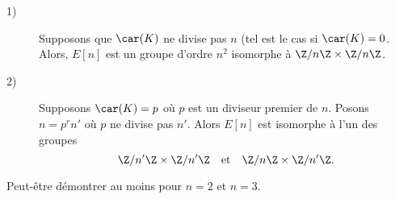 
\begin{theoreme}
    \begin{description}
        \item[1)] Supposons que $\car(K)$ ne divise pas $n$ (tel est le cas si $\car(K)=0$. Alors, $E[n]$ est un groupe d'ordre $n^2$ isomorphe à $\Z / n\Z \times \Z / n\Z$.
        \item[2)] Supposons $\car(K)=p$ où $p$ est un diviseur premier de $n$. Posons $n=p^{r}n'$ où $p$ ne divise pas $n'$. Alors $E[n]$ est isomorphe à l'un des groupes
            \[
            \Z / n'\Z \times \Z / n'\Z \quad \text{et} \quad \Z / n\Z \times \Z /n'\Z
            .\] 
    \end{description}
\end{theoreme}

\begin{demonstration}
    Peut-être démontrer au moins pour $n=2$ et $n=3$.    
\end{demonstration}
